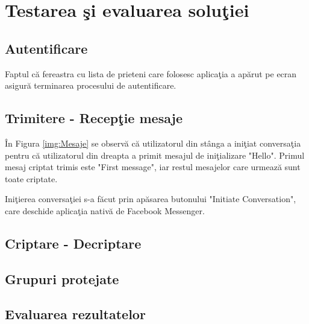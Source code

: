 \chapter{Testarea \c{s}i evaluarea solu\c{t}iei}

\section{Autentificare}

Faptul c\u{a} fereastra cu lista de prieteni care folosesc aplica\c{t}ia a ap\u{a}rut pe ecran asigur\u{a} terminarea procesului de autentificare.

\section{Trimitere - Recep\c{t}ie mesaje}

\^{I}n Figura \ref{img:Mesaje} se observ\u{a} c\u{a} utilizatorul din st\^{a}nga a ini\c{t}iat conversa\c{t}ia pentru c\u{a} utilizatorul din dreapta a primit mesajul de ini\c{t}ializare "Hello". Primul mesaj criptat trimis este "First message", iar restul mesajelor care urmeaz\u{a} sunt toate criptate. 

Ini\c{t}ierea conversa\c{t}iei s-a f\u{a}cut prin ap\u{a}sarea butonului "Initiate Conversation", care deschide aplica\c{t}ia nativ\u{a} de Facebook Messenger.

\newpage
\section{Criptare - Decriptare}

\newpage

\section{Grupuri protejate}

\newpage
\section{Evaluarea rezultatelor}